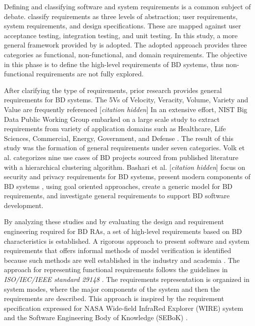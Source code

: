 \documentclass[a4paper,11pt]{article}
\let\cite\citep
\newcommand{\hc}{[\textit{citation hidden}]\textnormal{}}
\begin{document}
Defining and classifying software and system requirements is a common subject of debate. \citet{sommerville2011software} classify requirements as three levels of abstraction; user requirements, system requirements, and design specifications. These are mapped against user acceptance testing, integration testing, and unit testing. In this study, a more general framework provided by \citet{laplante2017requirements} is adopted. The adopted approach provides three categories as functional, non-functional, and domain requirements. The objective in this phase is to define the high-level requirements of BD systems, thus non-functional requirements are not fully explored. 


After clarifying the type of requirements, prior research provides general requirements for BD systems. The 5Vs of Velocity, Veracity, Volume, Variety and Value are frequently referenced 
\hc{}\cite{Bahrami2015,Chen2016a}
 In an extensive effort, NIST Big Data Public Working Group embarked on a large scale study to extract requirements from variety of application domains such as Healthcare, Life Sciences, Commercial, Energy, Government, and Defense \cite{Chang}. The result of this study was the formation of general requirements under seven categories. Volk et al. \cite{volk2020identifying} categorizes nine use cases of BD projects sourced from published literature with a hierarchical clustering algorithm. Bashari et al. 
\hc{}
 focus on security and privacy requirements for BD systems, \citet{yu2019components} present modern components of BD systems , using goal oriented approaches, \citet{eridaputra2014modeling} create a generic model for BD requirements, and  \citet{al2016characteristics} investigate general requirements to support BD software development. 



By analyzing these studies and by evaluating the design and requirement engineering required for BD RAs, a set of high-level requirements based on BD characteristics is established. A rigorous approach to present software and system requirements that offers informal methods of model verification is identified because such methods are well established in the industry and academia \cite{kassab2014state}.  The approach for representing functional requirements follows the guidelines in \emph{ISO/IEC/IEEE standard 29148} \cite{ISO29148}. The requirements representation is organized in system modes, where the major components of the system and then the requirements are described. This approach is inspired by the requirement specification expressed for NASA Wide-field InfraRed Explorer (WIRE) system \cite{laplante2017requirements} and the Software Engineering Body of Knowledge (SEBoK) \cite{abran2004software}.
\end{document}

